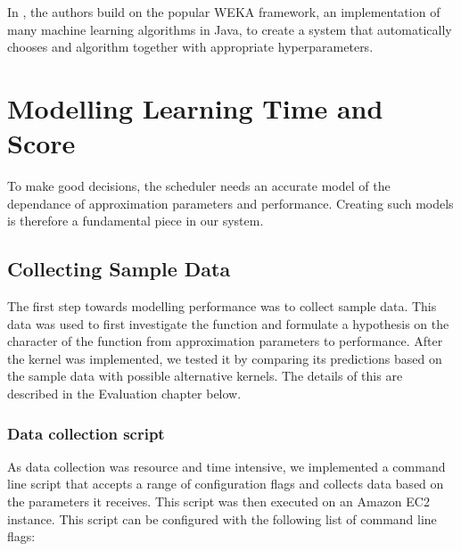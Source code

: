 \documentclass[a4paper,12pt,twoside,openright]{report}
\begin{document}
In \cite{ThoHutHooLey13-AutoWEKA}, the authors build on the popular WEKA framework, an implementation of many machine learning algorithms in Java, to create a system that automatically chooses and algorithm together with appropriate hyperparameters. %












\chapter{Modelling Learning Time and Score}
To make good decisions, the scheduler needs an accurate model of the dependance of approximation parameters and performance. Creating such models is therefore a fundamental piece in our system.

\section{Collecting Sample Data}
The first step towards modelling performance was to collect sample data. This data was used to first investigate the function and formulate a hypothesis on the character of the function from approximation parameters to performance. After the kernel was implemented, we tested it by comparing its predictions based on the sample data with possible alternative kernels. The details of this are described in the Evaluation chapter below.

\subsection{Data collection script}
As data collection was resource and time intensive, we implemented a command line script that accepts a range of configuration flags and collects data based on the parameters it receives. This script was then executed on an Amazon EC2 instance. This script can be configured with the following list of command line flags:
\end{document}
